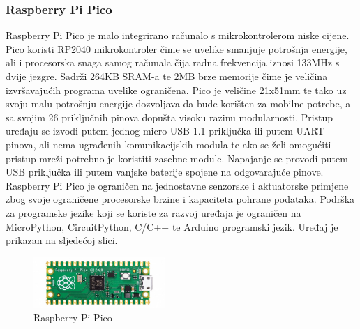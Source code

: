 \documentclass[times, utf8, diplomski]{fer}
\begin{document}
\subsubsection{Raspberry Pi Pico}
Raspberry Pi Pico\citep{RPiPico} je malo integrirano računalo s mikrokontrolerom niske cijene. Pico koristi RP2040 mikrokontroler čime se uvelike smanjuje potrošnja energije, ali i procesorska snaga samog računala čija radna frekvencija iznosi 133MHz s dvije jezgre. Sadrži 264KB SRAM-a te 2MB brze memorije čime je veličina izvršavajućih programa uvelike ograničena. Pico je veličine 21x51mm te tako uz svoju malu potrošnju energije dozvoljava da bude korišten za mobilne potrebe, a sa svojim 26 priključnih pinova dopušta visoku razinu modularnosti. Pristup uređaju se izvodi putem jednog micro-USB 1.1 priključka ili putem UART pinova, ali nema ugrađenih komunikacijskih modula te ako se želi omogućiti pristup mreži potrebno je koristiti zasebne module. Napajanje se provodi putem USB priključka ili putem vanjske baterije spojene na odgovarajuće pinove. Raspberry Pi Pico je ograničen na jednostavne senzorske i aktuatorske primjene zbog svoje ograničene procesorske brzine i kapaciteta pohrane podataka. Podrška za programske jezike koji se koriste za razvoj uređaja je ograničen na MicroPython, CircuitPython, C/C++ te Arduino programski jezik. Uređaj je prikazan na sljedećoj slici.
\begin{figure}[htb]
    \centering
    \includegraphics[width=5cm]{images/rpipico.jpg}
    \caption{Raspberry Pi Pico\citep{RPiPicoImg}}
    \label{fig:rpipico}
\end{figure}
\end{document}
